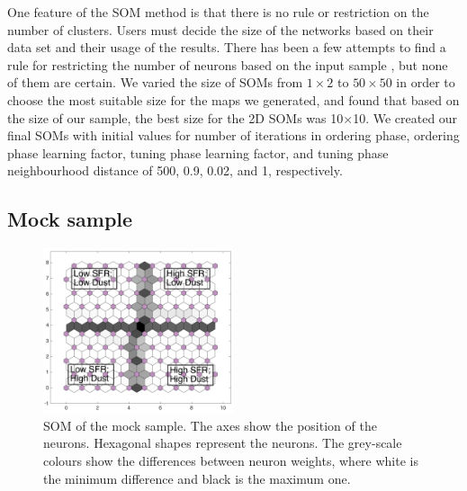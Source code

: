      One feature of the SOM method is that there is no rule or restriction on the number of clusters.
     Users must decide the size of the networks based on their data set and their usage of the results.
     There has been a few attempts to find a rule for restricting the number of neurons based on the input sample \citep[e.g.][]{Vesanto05}, but none of them are certain. 
     We varied the size of SOMs from $1\times2$ to $50\times50$ in order to choose the most suitable size for the maps we generated, and found that based on the size of our sample, the best size for the 2D SOMs was 10$\times$10. 
     We created our final SOMs with initial values for number of iterations in ordering phase, ordering phase learning factor, tuning phase learning factor, and tuning phase neighbourhood distance of 500, 0.9, 0.02, and 1, respectively. 
     
    
\subsection{Mock sample}
\label{sec: mock_sample}
 
         \begin{figure}
                \centering
                \includegraphics[width=0.5\textwidth]{../images0.01/mock_sample.png}
            \caption{SOM of the mock sample. The axes show the position of the neurons. Hexagonal shapes represent the neurons. The grey-scale colours show the differences between neuron weights, where white is the minimum difference and black is the maximum one.}
            \label{fig: sample}
        \end{figure}
 

